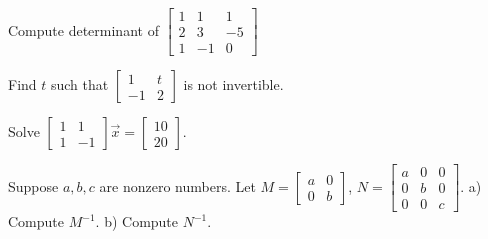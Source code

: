 \documentclass[12pt]{book}
\begin{document}
\setcounter{exercise}{100}

\begin{exercise}
Compute determinant of
$\left[ \begin{smallmatrix}
1 & 1 & 1 \\
2 & 3 & -5 \\
1 & -1 & 0
\end{smallmatrix}\right]$
\end{exercise}

\begin{exercise}
Find $t$ such that
$\left[ \begin{smallmatrix}
1 & t \\
-1 & 2
\end{smallmatrix}\right]$
is not invertible.
\end{exercise}

\begin{exercise}
Solve
$\left[ \begin{smallmatrix}
1 & 1 \\
1 & -1
\end{smallmatrix}\right] \vec{x} = 
\left[ \begin{smallmatrix}
10 \\ 20
\end{smallmatrix}\right]$.
\end{exercise}

\begin{exercise}
Suppose $a, b, c$ are nonzero numbers.
Let
$M=\left[ \begin{smallmatrix}
a & 0 \\
0 & b
\end{smallmatrix}\right]$,
$N=\left[ \begin{smallmatrix}
a & 0 & 0 \\
0 & b & 0 \\
0 & 0 & c
\end{smallmatrix}\right]$.
a) Compute $M^{-1}$.  b) Compute $N^{-1}$.
\end{exercise}
\end{document}
